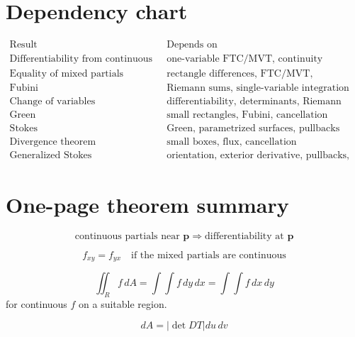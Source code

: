 \section*{Dependency chart}

\[
\begin{array}{c|l}
\text{Result} & \text{Depends on} \\ \hline
\text{Differentiability from continuous partials} &
\text{one-variable FTC/MVT, continuity}\\[1mm]

\text{Equality of mixed partials} &
\text{rectangle differences, FTC/MVT, continuity}\\[1mm]

\text{Fubini} &
\text{Riemann sums, single-variable integration}\\[1mm]

\text{Change of variables} &
\text{differentiability, determinants, Riemann sums}\\[1mm]

\text{Green} &
\text{small rectangles, Fubini, cancellation}\\[1mm]

\text{Stokes} &
\text{Green, parametrized surfaces, pullbacks}\\[1mm]

\text{Divergence theorem} &
\text{small boxes, flux, cancellation}\\[1mm]

\text{Generalized Stokes} &
\text{orientation, exterior derivative, pullbacks, cancellation}
\end{array}
\]

\section*{One-page theorem summary}

\[
\boxed{
    \text{continuous partials near }\mathbf p
    \Longrightarrow
    \text{differentiability at }\mathbf p
}
\]

\[
\boxed{
    f_{xy}=f_{yx}
    \quad\text{if the mixed partials are continuous}
}
\]

\[
\boxed{
    \iint_R f\,dA
    =
    \int\!\!\int f\,dy\,dx
    =
    \int\!\!\int f\,dx\,dy
}
\]
for continuous \(f\) on a suitable region.

\[
\boxed{
    dA=
    \left|
    \det DT
    \right|
    du\,dv
}
\]

